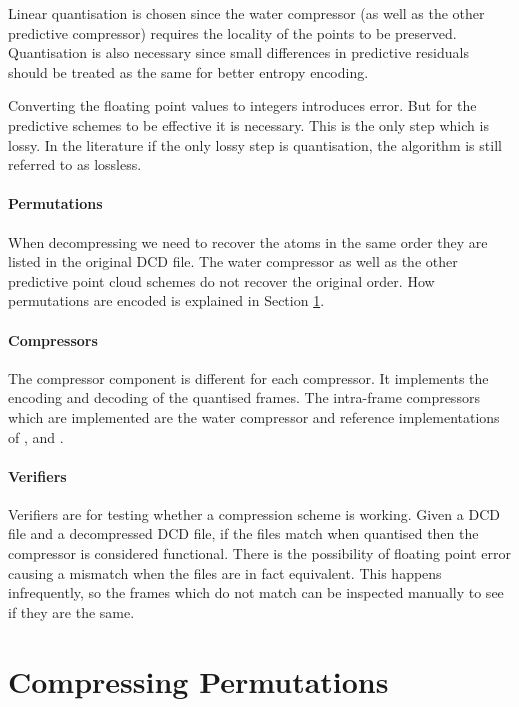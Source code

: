 \documentclass[a4paper]{report}
\begin{document}
Linear quantisation is chosen since the water compressor (as well as the other
predictive compressor) requires the locality of the points to be
preserved. Quantisation is also necessary since small differences in
predictive residuals should be treated as the same for better entropy
encoding.

Converting the floating point values to integers introduces error. But for the
predictive schemes to be effective it is necessary. This is the only step
which is lossy. In the literature if the only lossy step is quantisation, the
algorithm is still referred to as lossless.


\paragraph{Permutations}

When decompressing we need to recover the atoms in the same order they are
listed in the original DCD file. The water compressor as well as the other
predictive point cloud schemes do not recover the original order. How
permutations are encoded is explained in Section \ref{sec:compr-perm}.


\paragraph{Compressors}

The compressor component is different for each compressor. It implements the
encoding and decoding of the quantised frames. The intra-frame compressors
which are implemented are the water compressor and reference implementations
of \citet{omeltchenko2000sls}, \citet{gumholdcomp} and
\citet{devillers2000gci}.


\paragraph{Verifiers}

Verifiers are for testing whether a compression scheme is working. Given a DCD
file and a decompressed DCD file, if the files match when quantised then the
compressor is considered functional. There is the possibility of floating
point error causing a mismatch when the files are in fact equivalent. This
happens infrequently, so the frames which do not match can be inspected
manually to see if they are the same.


\section{Compressing Permutations}
\label{sec:compr-perm}
\end{document}

